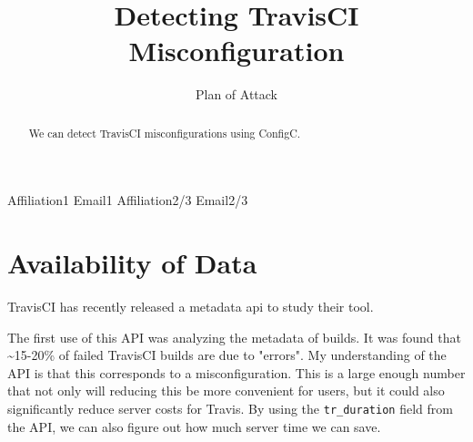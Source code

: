 \documentclass{sigplanconf}
\begin{document}
\setlength{\pdfpageheight}{\paperheight}\setlength{\pdfpagewidth}{\paperwidth}
   




\title{Detecting TravisCI Misconfiguration}
\subtitle{Plan of Attack}

           {Affiliation1}           {Email1}
           {Affiliation2/3}           {Email2/3}

\maketitle

\begin{abstract}
We can detect TravisCI misconfigurations using ConfigC.
\end{abstract}



\section{Availability of Data}

TravisCI has recently released a metadata api to study their tool\cite{API}.

The first use of this API was analyzing the metadata of builds. It was found that \textasciitilde 15-20\% of failed TravisCI builds are due to "errors". My understanding of the API is that this corresponds to a misconfiguration. This is a large enough number that not only will reducing this be more convenient for users, but it could also significantly reduce server costs for Travis. By using the \verb|tr_duration| field from the API, we can also figure out how much server time we can save\cite{API}.
\end{document}
